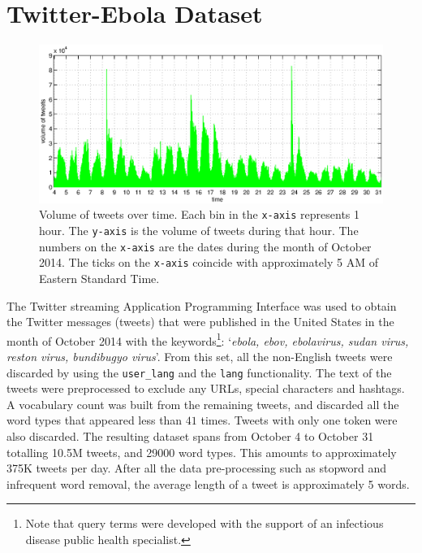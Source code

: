 \section{Twitter-Ebola Dataset}
\label{sec:data_and_model}
\begin{figure}
\centering
\includegraphics[width=\textwidth]{ICWSM/figures/hashtag_counts_date_time.eps}
\caption{Volume of tweets over time.  Each bin in the \texttt{x-axis} represents 1 hour.  The
\texttt{y-axis} is the volume of tweets during that hour.  The
numbers on the \texttt{x-axis} are the dates during the month of October 2014.  The ticks
on the \texttt{x-axis} coincide with approximately 5 AM of Eastern Standard Time.}
\label{fig:vol_time}
\end{figure}
The Twitter streaming Application Programming Interface was used to obtain the Twitter messages (tweets) that were published in the
United States in the month of October 2014 with the keywords\footnote{Note that query 
terms were developed with the support of an infectious disease public health specialist.}: 
`\emph{ebola, ebov, ebolavirus, sudan virus, reston virus, bundibugyo virus}'.
From this set, all the non-English tweets were discarded by using the \texttt{user\_lang}
and the \texttt{lang} functionality.
The text of the tweets were preprocessed to exclude any URLs, special characters and hashtags.
A vocabulary count was built from the remaining tweets, and discarded all the word types that appeared
less than $41$ times.  Tweets with only one token were also discarded.  The resulting dataset spans from
October 4 to October 31 totalling 10.5M tweets, and 29000 word types.  This amounts to approximately
375K tweets per day.  After all the data pre-processing such as stopword and infrequent word removal,
the average length of a tweet is approximately 5 words.  
